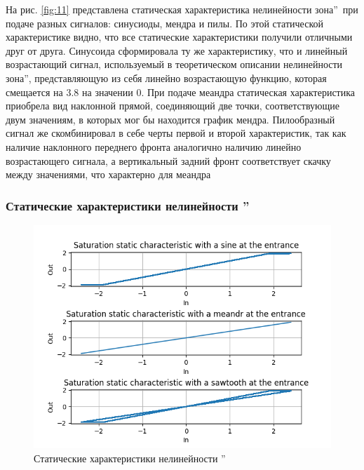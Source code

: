 На рис. \ref{fig:11} представлена статическая характеристика
нелинейности  зона\textquotedblright\ при подаче разных сигналов: синусиоды, мендра
и пилы. По этой статической характеристике видно, что все статические
характеристики получили отличными друг от друга. Синусоида
сформировала ту же характеристику, что и линейный возрастающий
сигнал, используемый в теоретическом описании нелинейности
 зона\textquotedblright, представляющую из себя линейно возрастающую
функцию, которая смещается на 3.8 на значении 0. При подаче меандра
статическая характеристика приобрела вид наклонной прямой,
соединяющий две точки, соответствующие двум значениям, в которых
мог бы находится график мендра. Пилообразный сигнал же скомбинировал
в себе черты первой и второй характеристик, так как наличие
наклонного переднего фронта аналогично наличию линейно
возрастающего сигнала, а вертикальный задний фронт соответствует
скачку между значениями, что характерно для меандра

\subsubsection{Статические характеристики нелинейности \textquotedblright}

\begin{figure}[H]
	\centering
	\includegraphics[width=0.7\linewidth]{body/images/saturation-static-characteristics.png}
	\caption{Статические характеристики нелинейности \textquotedblright}
	\label{fig:12}
\end{figure}

